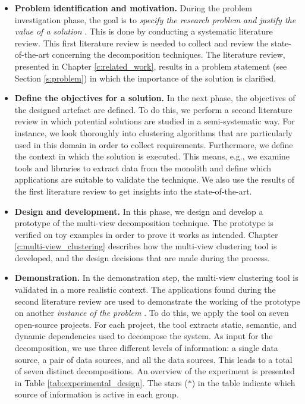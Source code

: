 \begin{itemize}
    \item \textbf{Problem identification and motivation.} During the problem investigation phase, the goal is to \textit{specify the research problem and justify the value of a solution} \cite{peffers2007design}. This is done by conducting a systematic literature review. This first literature review is needed to collect and review the state-of-the-art concerning the decomposition techniques. The literature review, presented in Chapter \ref{c:related_work}, results in a problem statement (see Section \ref{s:problem}) in which the importance of the solution is clarified.
    \item \textbf{Define the objectives for a solution.} In the next phase, the objectives of the designed artefact are defined. To do this, we perform a second literature review in which potential solutions are studied in a semi-systematic way. For instance, we look thoroughly into clustering algorithms that are particularly used in this domain in order to collect requirements. Furthermore, we define the context in which the solution is executed. This means, e.g., we examine tools and libraries to extract data from the monolith and define which applications are suitable to validate the technique. We also use the results of the first literature review to get insights into the state-of-the-art. 
    \item \textbf{Design and development.} In this phase, we design and develop a prototype of the multi-view decomposition technique. The prototype is verified on toy examples in order to prove it works as intended. Chapter \ref{c:multi-view_clustering} describes how the multi-view clustering tool is developed, and the design decisions that are made during the process.
    \item \textbf{Demonstration.} In the demonstration step, the multi-view clustering tool is validated in a more realistic context. The applications found during the second literature review are used to demonstrate the working of the prototype on another \textit{instance of the problem} \cite{peffers2007design}. To do this, we apply the tool on seven open-source projects. For each project, the tool extracts static, semantic, and dynamic dependencies used to decompose the system. As input for the decomposition, we use three different levels of information: a single data source, a pair of data sources, and all the data sources. This leads to a total of seven distinct decompositions. An overview of the experiment is presented in Table \ref{tab:experimental_design}. The stars ($*$) in the table indicate which source of information is active in each group.

\end{itemize}
